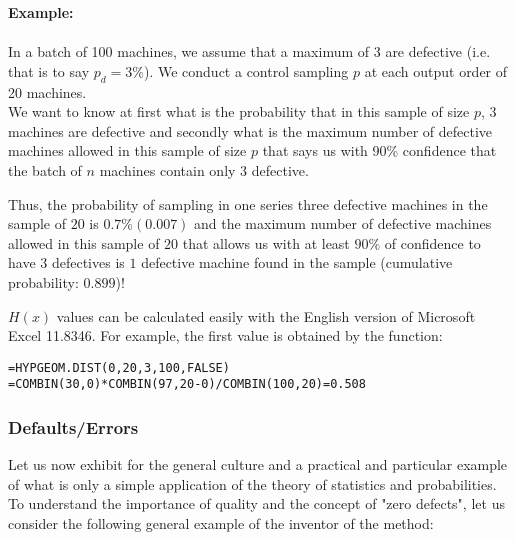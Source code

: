 	\begin{tcolorbox}[colframe=black,colback=white,sharp corners]
\textbf{{\Large {}}Example:}\\\\
In a batch of 100 machines, we assume that a maximum of 3 are defective (i.e. that is to say $p_d=3\%$). We conduct a control sampling $p$ at each output order of 20 machines.\\

We want to know at first what is the probability that in this sample of size $p$, 3 machines are defective and secondly what is the maximum number of defective machines allowed in this sample of size $p$ that says us with 90\% confidence that the batch of $n$ machines contain only 3 defective.

	
	Thus, the probability of sampling in one series three defective machines in the sample of $20$ is $0.7\% (0.007)$ and the maximum number of defective machines allowed in this sample of $20$ that allows us with at least $90\%$ of confidence to have $3$ defectives is $1$ defective machine found in the sample (cumulative probability: $0.899$)!

	$H(x)$ values can be calculated easily with the English version of Microsoft Excel 11.8346. For example, the first value is obtained by the function:
	\begin{center}
	\texttt{=HYPGEOM.DIST(0,20,3,100,FALSE)\\=COMBIN(30,0)*COMBIN(97,20-0)/COMBIN(100,20)=0.508}
	\end{center}
	\end{tcolorbox}
	
\subsubsection{Defaults/Errors}

Let us now exhibit for the general culture and a practical and particular example of what is only a simple application of the theory of statistics and probabilities. To understand the importance of quality and the concept of "zero defects", let us consider the following general example of the inventor of the method:


